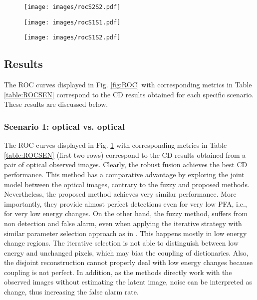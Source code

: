 \documentclass[review]{elsarticle}
\begin{document}
\newcommand{\subfigwidthROC}{0.65\columnwidth}
\newcommand{\figwidthROC}{1\textwidth}
	\begin{figure*}
    	\centering
        	\begin{subfigure}{\subfigwidthROC}
					\centering	
					\texttt{[image: images/rocS2S2.pdf]}
					\caption{}
					\label{fig:rocS2S2}
			\end{subfigure}
			\begin{subfigure}{\subfigwidthROC}
					\centering	
				  	\texttt{[image: images/rocS1S1.pdf]}
					\caption{}
					\label{fig:rocS1S1}
			\end{subfigure}
			\begin{subfigure}{\subfigwidthROC}
					\centering
					\texttt{[image: images/rocS1S2.pdf]}
					\caption{}
					\label{fig:rocS1S2}
			\end{subfigure}
			\caption{ROC curves on simulated data for different scenarios:  \protect{} Scenario 1,  \protect{} Scenario 2, \protect{} Scenario 3.}%
            \label{fig:ROC}%
	\end{figure*}


\subsection{Results}

The ROC curves displayed in Fig. \ref{fig:ROC} with corresponding metrics in Table \ref{table:ROCSEN} correspond to the CD results obtained for each specific scenario. These results are discussed below.

\subsubsection{Scenario 1: optical vs. optical}
The ROC curves displayed in Fig. \ref{fig:rocS2S2} with corresponding metrics in Table \ref{table:ROCSEN} (first two rows) correspond to the CD results obtained from a pair of optical observed images. Clearly, the robust fusion achieves the best CD performance. This method has a comparative advantage by exploring the joint model between the optical images, contrary to the fuzzy and proposed methods. Nevertheless, the proposed method achieves very similar performance. More importantly, they provide almost perfect detections even for very low PFA, i.e., for very low energy changes. On the other hand, the fuzzy method, suffers from non detection and false alarm, even when applying the iterative strategy with similar parameter selection approach as in \citet{gong_coupled_2016}. This happens mostly in low energy change regions. The iterative selection is not able to distinguish between low energy and unchanged pixels, which may bias the coupling of dictionaries. Also, the disjoint reconstruction cannot properly deal with low energy changes because coupling is not perfect. In addition, as the methods directly work with the observed images without estimating the latent image, noise can be interpreted as change, thus increasing the false alarm rate.
	
\end{document}
